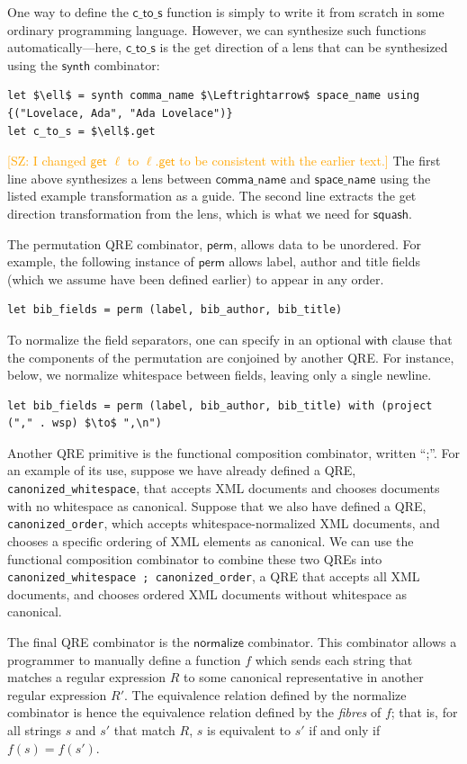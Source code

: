 \documentclass[acmsmall,review,anonymous]{acmart}
\newcommand{\FINISH}[3]{\ifdraft\textcolor{#1}{[#2: #3]}\fi}
\newcommand{\saz}[1]{\FINISH{orange}{SZ}{#1}}
\newcommand{\codefont}[1]{\ensuremath{\mathsf{#1}}}
\newcommand{\kw}[1]{\textcolor{dkred}{\ensuremath{\mathsf{#1}}}}
\begin{document}
One way to define the \codefont{c\_to\_s} function
is simply to write it from scratch in some ordinary programming language.
However, we can synthesize such functions automatically---here, \codefont{c\_to\_s} is the
get direction of a lens that can be synthesized using the 
\kw{synth} combinator:
%
\begin{lstlisting}
let $\ell$ = synth comma_name $\Leftrightarrow$ space_name using {("Lovelace, Ada", "Ada Lovelace")}
let c_to_s = $\ell$.get 
\end{lstlisting}
\noindent \saz{I changed \codefont{get} $\ell$ to $\ell$.\kw{get} to be
  consistent with the earlier text.}
The first line above synthesizes a lens between \codefont{comma\_name} and
\codefont{space\_name} using the listed example transformation as a guide.  The
second line extracts the get direction transformation from the lens,
which is what we need for \kw{squash}.

The permutation QRE combinator, \kw{perm}, allows data to be unordered. For example,
the following instance of \kw{perm} allows label, author and title fields
(which we assume have been defined earlier) to appear in any order.
%
\begin{lstlisting}
let bib_fields = perm (label, bib_author, bib_title)
\end{lstlisting}
%
To normalize the field separators, one can specify 
in an optional \kw{with} clause that the components of the
permutation are conjoined by another QRE. For instance, below, we normalize
whitespace between fields, leaving only a single newline.
%
\begin{lstlisting}
let bib_fields = perm (label, bib_author, bib_title) with (project ("," . wsp) $\to$ ",\n")
\end{lstlisting}

Another QRE primitive is the functional composition combinator, written ``;''.
For an example of its use, suppose we have already defined a QRE,
\lstinline{canonized_whitespace}, that accepts XML documents and chooses
documents with no whitespace as canonical. Suppose that we also have defined a
QRE, \lstinline{canonized_order}, which accepts whitespace-normalized XML
documents, and chooses a specific ordering of XML elements as canonical. We can
use the functional composition combinator to combine these two QREs into
\lstinline{canonized_whitespace ; canonized_order}, a QRE that accepts all XML
documents, and chooses ordered XML documents without whitespace as canonical.

The final QRE combinator is the \kw{normalize} combinator. This combinator
allows a programmer to manually define a function $f$ which sends each
string that matches a regular expression $R$ to some canonical
representative in another regular expression $R'$. The equivalence
relation defined by the normalize combinator is hence the equivalence
relation defined by the {\em fibres} of $f$; that is, for all strings
$s$ and $s'$ that match $R$, $s$ is equivalent to $s'$ if and only if
$f(s) = f(s')$.
\end{document}
